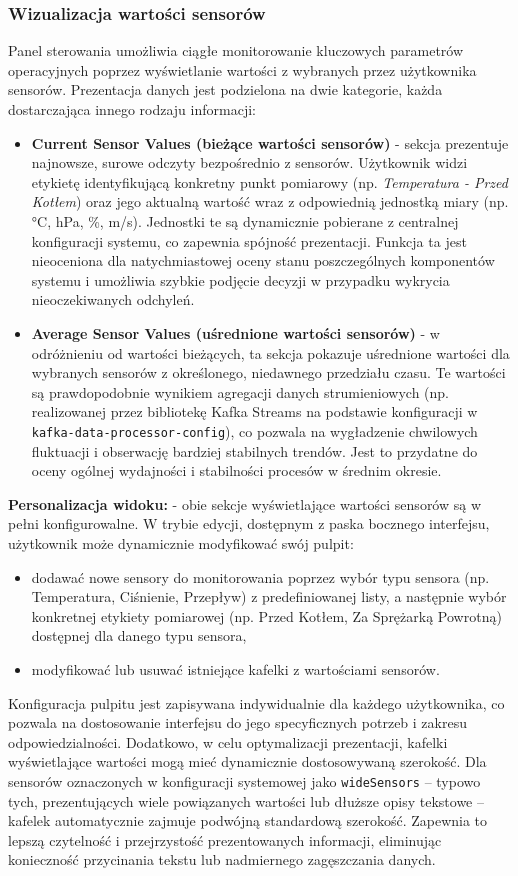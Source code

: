 \subsubsection{Wizualizacja wartości sensorów}
Panel sterowania umożliwia ciągłe monitorowanie kluczowych parametrów operacyjnych poprzez wyświetlanie wartości z wybranych przez użytkownika sensorów. Prezentacja danych jest podzielona na dwie kategorie, każda dostarczająca innego rodzaju informacji:
\begin{itemize}
    \item \textbf{Current Sensor Values (bieżące wartości sensorów)} - sekcja prezentuje najnowsze, surowe odczyty bezpośrednio z sensorów. Użytkownik widzi etykietę identyfikującą konkretny punkt pomiarowy (np. \textit{Temperatura - Przed Kotłem}) oraz jego aktualną wartość wraz z odpowiednią jednostką miary (np. °C, hPa, \%, m/s). Jednostki te są dynamicznie pobierane z centralnej konfiguracji systemu, co zapewnia spójność prezentacji. Funkcja ta jest nieoceniona dla natychmiastowej oceny stanu poszczególnych komponentów systemu i umożliwia szybkie podjęcie decyzji w przypadku wykrycia nieoczekiwanych odchyleń.
    \item \textbf{Average Sensor Values (uśrednione wartości sensorów)} - w odróżnieniu od wartości bieżących, ta sekcja pokazuje uśrednione wartości dla wybranych sensorów z określonego, niedawnego przedziału czasu. Te wartości są prawdopodobnie wynikiem agregacji danych strumieniowych (np. realizowanej przez bibliotekę Kafka Streams na podstawie konfiguracji w \texttt{kafka-data-processor-config}), co pozwala na wygładzenie chwilowych fluktuacji i obserwację bardziej stabilnych trendów. Jest to przydatne do oceny ogólnej wydajności i stabilności procesów w średnim okresie.
\end{itemize}
\textbf{Personalizacja widoku:} - obie sekcje wyświetlające wartości sensorów są w pełni konfigurowalne. W trybie edycji, dostępnym z paska bocznego interfejsu, użytkownik może dynamicznie modyfikować swój pulpit:
\begin{itemize}
    \item dodawać nowe sensory do monitorowania poprzez wybór typu sensora (np. Temperatura, Ciśnienie, Przepływ) z predefiniowanej listy, a następnie wybór konkretnej etykiety pomiarowej (np. Przed Kotłem, Za Sprężarką Powrotną) dostępnej dla danego typu sensora,
    \item modyfikować lub usuwać istniejące kafelki z wartościami sensorów.
\end{itemize}
Konfiguracja pulpitu jest zapisywana indywidualnie dla każdego użytkownika, co pozwala na dostosowanie interfejsu do jego specyficznych potrzeb i zakresu odpowiedzialności. Dodatkowo, w celu optymalizacji prezentacji, kafelki wyświetlające wartości mogą mieć dynamicznie dostosowywaną szerokość. Dla sensorów oznaczonych w konfiguracji systemowej jako \texttt{wideSensors} – typowo tych, prezentujących wiele powiązanych wartości lub dłuższe opisy tekstowe – kafelek automatycznie zajmuje podwójną standardową szerokość. Zapewnia to lepszą czytelność i przejrzystość prezentowanych informacji, eliminując konieczność przycinania tekstu lub nadmiernego zagęszczania danych.

